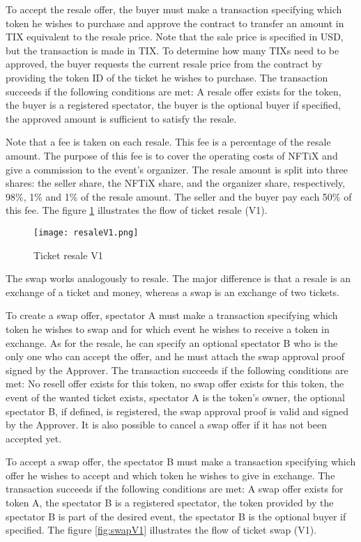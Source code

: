 \documentclass[a4paper,11pt,oneside]{report}
\begin{document}
To accept the resale offer, the buyer must make a transaction specifying which token he wishes to purchase and approve the contract to transfer an amount in TIX equivalent to the resale price. Note that the sale price is specified in USD, but the transaction is made in TIX. To determine how many TIXs need to be approved, the buyer requests the current resale price from the contract by providing the token ID of the ticket he wishes to purchase. The transaction succeeds if the following conditions are met: A resale offer exists for the token, the buyer is a registered spectator, the buyer is the optional buyer if specified, the approved amount is sufficient to satisfy the resale.

Note that a fee is taken on each resale. This fee is a percentage of the resale amount. The purpose of this fee is to cover the operating costs of NFTiX and give a commission to the event's organizer. The resale amount is split into three shares: the seller share, the NFTiX share, and the organizer share, respectively, 98\%, 1\% and 1\% of the resale amount. The seller and the buyer pay each 50\% of this fee. The figure \hyperref[fig:resaleV1]{\ref{fig:resaleV1}} illustrates the flow of ticket resale (V1).

\begin{figure}[h!]
  \texttt{[image: resaleV1.png]}
  \caption{Ticket resale V1}
  \label{fig:resaleV1}
\end{figure}

The swap works analogously to resale. The major difference is that a resale is an exchange of a ticket and money, whereas a swap is an exchange of two tickets.

To create a swap offer, spectator A must make a transaction specifying which token he wishes to swap and for which event he wishes to receive a token in exchange. As for the resale, he can specify an optional spectator B who is the only one who can accept the offer, and he must attach the swap approval proof signed by the Approver. The transaction succeeds if the following conditions are met: No resell offer exists for this token, no swap offer exists for this token, the event of the wanted ticket exists, spectator A is the token's owner, the optional spectator B, if defined, is registered, the swap approval proof is valid and signed by the Approver. It is also possible to cancel a swap offer if it has not been accepted yet.

To accept a swap offer, the spectator B must make a transaction specifying which offer he wishes to accept and which token he wishes to give in exchange. The transaction succeeds if the following conditions are met: A swap offer exists for token A, the spectator B is a registered spectator, the token provided by the spectator B is part of the desired event, the spectator B is the optional buyer if specified. The figure \hyperref[fig:swapV1]{\ref{fig:swapV1}} illustrates the flow of ticket swap (V1).
\end{document}
